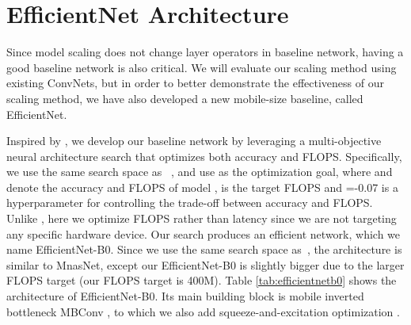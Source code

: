 \documentclass{article}
\begin{document}
\section{EfficientNet Architecture}
\label{sec:method}

Since model scaling does not change layer operators  in baseline network, having a good baseline network is also critical.  We will evaluate our scaling method using existing ConvNets, but in order to better demonstrate the effectiveness of our scaling method, we have also developed a new mobile-size baseline, called EfficientNet.

Inspired by \cite{mnas18}, we develop our baseline network by leveraging a multi-objective neural architecture search that optimizes both accuracy and FLOPS.
Specifically, we use the same search space as ~\cite{mnas18},  and use  as the optimization goal, where  and  denote the accuracy and FLOPS of model ,  is the target FLOPS and =-0.07 is a hyperparameter for controlling the trade-off between accuracy and FLOPS. Unlike \cite{mnas18,proxyless18}, here we optimize FLOPS rather than latency since we are not targeting any specific hardware device. Our search produces an efficient network, which we name EfficientNet-B0. Since we use the same search space as~\cite{mnas18}, the architecture is similar to MnasNet, except our EfficientNet-B0 is slightly bigger due to the larger FLOPS target (our FLOPS target is 400M).
Table \ref{tab:efficientnetb0} shows the architecture of EfficientNet-B0. Its main building block is mobile inverted bottleneck MBConv \cite{mobilenetv218,mnas18}, to which we also add squeeze-and-excitation optimization \cite{senet18}.
\end{document}
